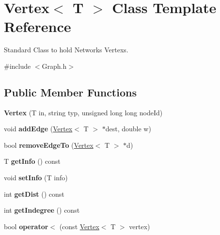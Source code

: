\hypertarget{class_vertex}{}\section{Vertex$<$ T $>$ Class Template Reference}
\label{class_vertex}


Standard Class to hold Network\textquotesingle{}s Vertexs.  




{\ttfamily \#include $<$Graph.\+h$>$}

\subsection*{Public Member Functions}
\begin{DoxyCompactItemize}
\item 
\hypertarget{class_vertex_a8898f3b399880a39ff8f37b3eaf50f57}{}\label{class_vertex_a8898f3b399880a39ff8f37b3eaf50f57} 
{\bfseries Vertex} (T in, string typ, unsigned long long node\+Id)
\item 
\hypertarget{class_vertex_aeb024eced2da142912f189af6a454db3}{}\label{class_vertex_aeb024eced2da142912f189af6a454db3} 
void {\bfseries add\+Edge} (\hyperlink{class_vertex}{Vertex}$<$ T $>$ $\ast$dest, double w)
\item 
\hypertarget{class_vertex_ab2b5b43fb1709a901b78718436763a84}{}\label{class_vertex_ab2b5b43fb1709a901b78718436763a84} 
bool {\bfseries remove\+Edge\+To} (\hyperlink{class_vertex}{Vertex}$<$ T $>$ $\ast$d)
\item 
\hypertarget{class_vertex_a48eae2f7af2362634adab02b7b2dbec6}{}\label{class_vertex_a48eae2f7af2362634adab02b7b2dbec6} 
T {\bfseries get\+Info} () const
\item 
\hypertarget{class_vertex_a31cd60c26640f8072a928ba70eb2f95e}{}\label{class_vertex_a31cd60c26640f8072a928ba70eb2f95e} 
void {\bfseries set\+Info} (T info)
\item 
\hypertarget{class_vertex_a645a81161bc9f70ebfda8e292b91c24b}{}\label{class_vertex_a645a81161bc9f70ebfda8e292b91c24b} 
int {\bfseries get\+Dist} () const
\item 
\hypertarget{class_vertex_ac78980191ea1f9d22e6617e9e511b755}{}\label{class_vertex_ac78980191ea1f9d22e6617e9e511b755} 
int {\bfseries get\+Indegree} () const
\item 
\hypertarget{class_vertex_a7091b26f281a5041b1775a3d3f9cb7a6}{}\label{class_vertex_a7091b26f281a5041b1775a3d3f9cb7a6} 
bool {\bfseries operator$<$} (const \hyperlink{class_vertex}{Vertex}$<$ T $>$ vertex)
\end{DoxyCompactItemize}
